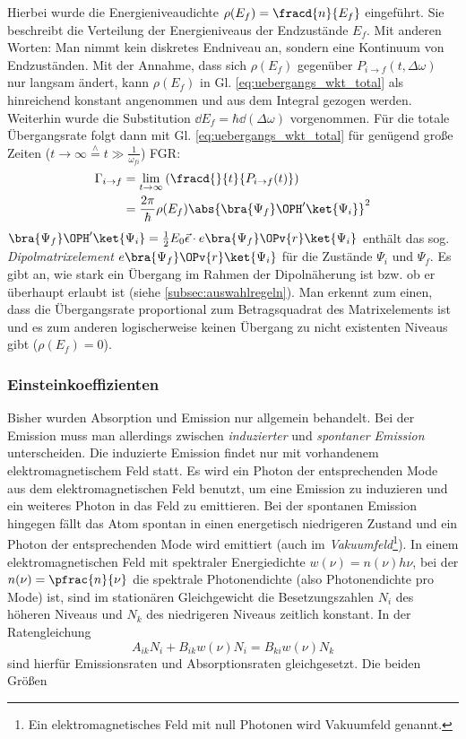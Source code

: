 Hierbei wurde die Energieniveaudichte $\rho(E_f)=\fracd{n}{E_f}$ eingeführt. Sie
beschreibt die Verteilung der Energieniveaus der Endzustände $E_f$. Mit anderen
Worten: Man nimmt kein diskretes Endniveau an, sondern eine Kontinuum
von Endzuständen. Mit der Annahme, dass sich $\rho(E_f)$ gegenüber $P_{i\to
f}(t,\Delta\omega)$ nur langsam ändert, kann $\rho(E_f)$ in Gl. \eqref{eq:uebergangs_wkt_total} als hinreichend konstant angenommen und aus dem Integral gezogen werden. Weiterhin wurde die Substitution $\dd E_f=\hbar\dd(\Delta\omega)$ vorgenommen. Für die
totale Übergangsrate folgt dann mit Gl. \eqref{eq:uebergangs_wkt_total}
für genügend große Zeiten ($t\to\infty\stackrel{\wedge}{=}
t\gg\frac{1}{\omega_{fi}}$) FGR:
\begin{equation}\label{eq:uebergangs_rate_total}
	\begin{split}
		\Gamma_{i\to f}
		&= \lim_{t\to\infty}{\left(\fracd{}{t}{P_{i\to f}(t)}\right)}\\
		&= \frac{2\pi}{\hbar}\rho(E_f)\abs{\bra{\Psi_f}\OPH'\ket{\Psi_i}}^2
	\end{split}
\end{equation}
$\bra{\Psi_f}\OPH'\ket{\Psi_i} =
\frac{1}{2}E_0\vec{\epsilon}\cdot e\bra{\Psi_f}\OPv{r}\ket{\Psi_i}$ enthält
das sog. \textit{Dipolmatrixelement} $e\bra{\Psi_f}\OPv{r}\ket{\Psi_i}$ für die Zustände
$\Psi_i$ und $\Psi_f$. Es gibt an, wie stark ein Übergang im Rahmen der
Dipolnäherung ist bzw. ob er überhaupt erlaubt ist (siehe
\ref{subsec:auswahlregeln}). Man erkennt zum einen, dass die Übergangsrate proportional zum
Betragsquadrat des Matrixelements ist und es zum anderen logischerweise keinen
Übergang zu nicht existenten Niveaus gibt ($\rho(E_f)=0$). 

\subsubsection{Einsteinkoeffizienten}\label{subsubsec:einsteinkoeffizienten}
Bisher wurden Absorption und Emission nur allgemein behandelt. Bei der Emission
muss man allerdings zwischen \textit{induzierter} und \textit{spontaner
Emission} unterscheiden. Die induzierte Emission findet nur mit vorhandenem
elektromagnetischem Feld statt. Es wird ein Photon der entsprechenden Mode aus
dem elektromagnetischen Feld benutzt, um eine Emission zu induzieren und ein
weiteres Photon in das Feld zu emittieren. Bei der spontanen Emission hingegen
fällt das Atom spontan in einen energetisch niedrigeren Zustand und ein
Photon der entsprechenden Mode wird emittiert (auch im
\textit{Vakuumfeld}\footnote{Ein elektromagnetisches Feld mit null Photonen
wird Vakuumfeld genannt.}).
In einem elektromagnetischen Feld mit spektraler Energiedichte $w(\nu)=n(\nu)h\nu$, bei
der $n(\nu)=\pfrac{n}{\nu}$ die spektrale Photonendichte (also Photonendichte
pro Mode) ist, sind im stationären Gleichgewicht die Besetzungszahlen $N_i$ des
höheren Niveaus und $N_k$ des niedrigeren Niveaus zeitlich konstant. In der Ratengleichung
\begin{equation}\label{eq:raten_gleichung}
	A_{ik}N_i+B_{ik}w(\nu)N_i=B_{ki}w(\nu)N_k
\end{equation}
sind hierfür Emissionsraten und Absorptionsraten gleichgesetzt.
Die beiden Größen

